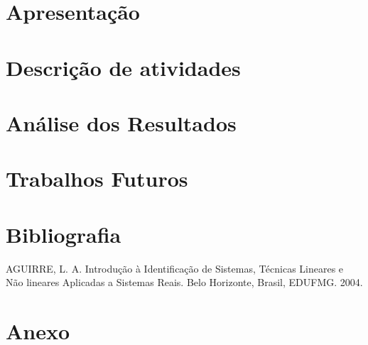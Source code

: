 \documentclass[a4paper,12pt]{article}
\begin{document}
\section{Apresentação}
\newpage

\section{Descrição de atividades}

\newpage
\section{Análise dos Resultados}
\newpage
\section{Trabalhos Futuros}
\newpage

\section*{Bibliografia}
\footnotesize{

\noindent AGUIRRE, L. A. Introdução à Identificação de Sistemas, Técnicas Lineares e Não lineares Aplicadas a Sistemas Reais. Belo Horizonte, Brasil, EDUFMG. 2004.\\

}
\newpage
{}
\section*{Anexo}
\end{document}
